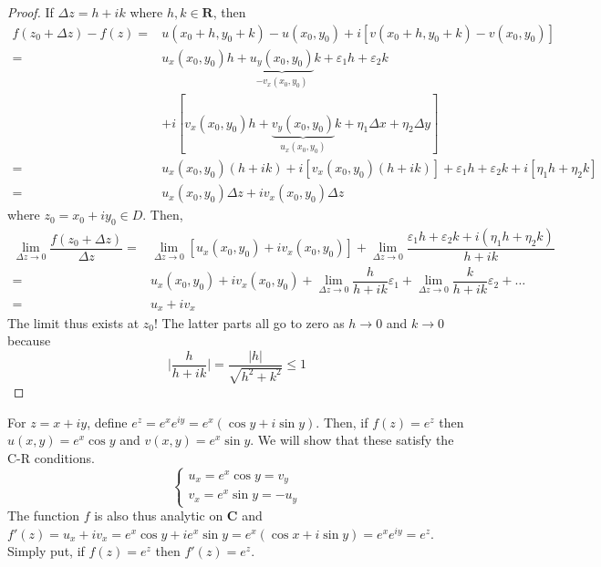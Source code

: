 \begin{proof}
If $\Delta z=h+ik$ where $h,k\in {\bm R}$, then 
\begin{align*}
	f(z_0+\Delta z)-f(z)=&u(x_0+h,y_0+k)-u(x_0,y_0)+i[v(x_0+h,y_0+k)-v(x_0,y_0)]\\
	=&u_{x}(x_0,y_0)h+\underbrace{u_{y}(x_0,y_0)}_{-v_{x}(x_0,y_0)}k+\varepsilon_1h+\varepsilon_2k\\&+i[v_{x}(x_0,y_0)h+\underbrace{v_{y}(x_0,y_0)}_{u_{x}(x_0,y_0)}k+\eta_1\Delta x+\eta_2\Delta y]\\
	=&u_{x}(x_0,y_0)(h+ik)+i[v_{x}(x_0,y_0)(h+ik)]+\varepsilon_1h+\varepsilon_2k+i[\eta_1h+\eta_2k]\\
=&u_{x}(x_0,y_0)\Delta z+iv_{x}(x_0,y_0)\Delta z
\end{align*}
where $z_0=x_0+iy_0\in D$. Then,
\begin{align*}
	\lim _{\Delta z\rightarrow 0}\dfrac{f(z_0+\Delta z)}{\Delta z}=&\lim _{\Delta z\rightarrow 0}[u_{x}(x_0,y_0)+iv_{x}(x_0,y_0)]+\lim _{\Delta z\rightarrow 0}\dfrac{\varepsilon_1h+\varepsilon_2k+i(\eta_1h+\eta_2k)}{h+ik}\\
	=&u_{x}(x_0,y_0)+iv_{x}(x_0,y_0)+\lim _{\Delta z\rightarrow 0}\dfrac{h}{h+ik}\varepsilon_1+\lim _{\Delta z\rightarrow 0}\dfrac{k}{h+ik}\varepsilon_2+\ldots\\
=&u_{x}+iv_{x}
\end{align*}
The limit thus exists at $z_0$! The latter parts all go to zero as $h\rightarrow 0$ and $k\rightarrow 0$ because
\[\Big|\dfrac{h}{h+ik}\Big|=\dfrac{|h|}{\sqrt{h^2+k^2}}\leq 1\]
\end{proof}
\vspace{2ex}
\begin{ex}
For $z=x+iy$, define $e^{z}=e^{x}e^{iy}=e^{x}(\cos y+i\sin y)$. Then, if $f(z)=e^{z}$ then $u(x,y)=e^{x}\cos y$ and $v(x,y)=e^{x}\sin y$. We will show that these satisfy the C-R conditions.
\[\begin{cases}
u_{x}=e^{x}\cos y=v_{y}\\
v_{x}=e^{x} \sin y=-u_{y}
\end{cases}\]
The function $f$ is also thus analytic on ${\bm C}$ and $f'(z)=u_{x}+iv_{x}=e^{x}\cos y+ie^{x}\sin y=e^{x}(\cos x+i\sin y)=e^{x}e^{iy}=e^{z}$. Simply put, if $f(z)=e^{z}$ then $f'(z)=e^{z}$. 
\end{ex}
\vspace{2ex}
